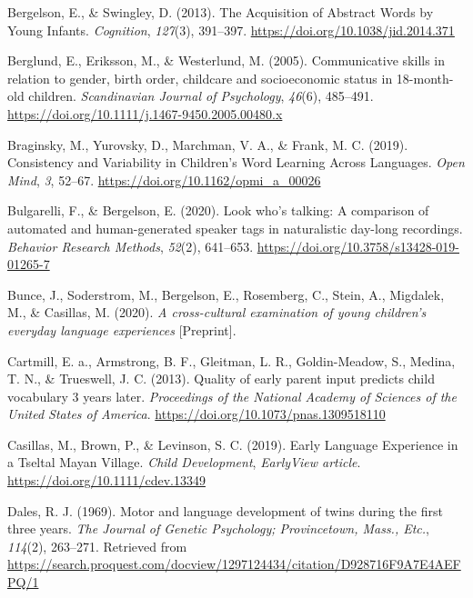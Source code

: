 \documentclass[
  man,floatsintext]{apa6}
\newlength{\cslhangindent}
\newlength{\cslentryspacingunit} %
\newenvironment{CSLReferences}[2] %
 {%
  \setlength{\parindent}{0pt}
  \ifodd #1
  \let\oldpar\par
  \def\par{\hangindent=\cslhangindent\oldpar}
  \fi
  \setlength{\parskip}{#2\cslentryspacingunit}
 }%
 {}
\begin{document}
\begin{CSLReferences}{1}{0}
\leavevmode{}%
Bergelson, E., \& Swingley, D. (2013). The {Acquisition} of {Abstract} {Words} by {Young} {Infants}. \emph{Cognition}, \emph{127}(3), 391--397. \url{https://doi.org/10.1038/jid.2014.371}

\leavevmode{}%
Berglund, E., Eriksson, M., \& Westerlund, M. (2005). Communicative skills in relation to gender, birth order, childcare and socioeconomic status in 18-month-old children. \emph{Scandinavian Journal of Psychology}, \emph{46}(6), 485--491. \url{https://doi.org/10.1111/j.1467-9450.2005.00480.x}

\leavevmode{}%
Braginsky, M., Yurovsky, D., Marchman, V. A., \& Frank, M. C. (2019). Consistency and {Variability} in {Children}'s {Word} {Learning} {Across} {Languages}. \emph{Open Mind}, \emph{3}, 52--67. \url{https://doi.org/10.1162/opmi_a_00026}

\leavevmode{}%
Bulgarelli, F., \& Bergelson, E. (2020). Look who's talking: {A} comparison of automated and human-generated speaker tags in naturalistic day-long recordings. \emph{Behavior Research Methods}, \emph{52}(2), 641--653. \url{https://doi.org/10.3758/s13428-019-01265-7}

\leavevmode{}%
Bunce, J., Soderstrom, M., Bergelson, E., Rosemberg, C., Stein, A., Migdalek, M., \& Casillas, M. (2020). \emph{A cross-cultural examination of young children's everyday language experiences} {[}Preprint{]}.

\leavevmode{}%
Cartmill, E. a., Armstrong, B. F., Gleitman, L. R., Goldin-Meadow, S., Medina, T. N., \& Trueswell, J. C. (2013). Quality of early parent input predicts child vocabulary 3 years later. \emph{Proceedings of the National Academy of Sciences of the United States of America}. \url{https://doi.org/10.1073/pnas.1309518110}

\leavevmode{}%
Casillas, M., Brown, P., \& Levinson, S. C. (2019). Early {Language} {Experience} in a {Tseltal} {Mayan} {Village}. \emph{Child Development}, \emph{EarlyView article}. \url{https://doi.org/10.1111/cdev.13349}

\leavevmode{}%
Dales, R. J. (1969). Motor and language development of twins during the first three years. \emph{The Journal of Genetic Psychology; Provincetown, Mass., Etc.}, \emph{114}(2), 263--271. Retrieved from \url{https://search.proquest.com/docview/1297124434/citation/D928716F9A7E4AEFPQ/1}


\end{CSLReferences}
\end{document}
